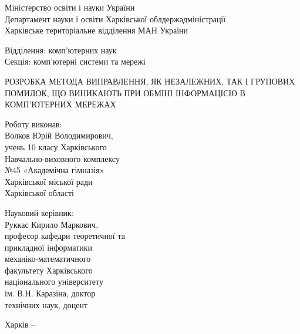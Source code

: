 \documentclass[a4paper, 14pt]{article}
\begin{document}
\thispagestyle{empty}
\begin{spacing}{1}
\begin{center}
Міністерство освіти і науки України\\
Департамент науки і освіти Харківської облдержадміністрації\\
Харківське територіальне відділення МАН України\\
\end{center}\par\null\par
\begin{changemargin}{10cm}{0cm}
Відділення: комп'ютерних наук\\
Секція: комп'ютерні системи та мережі
\end{changemargin}\par\null\par
\begin{center}
РОЗРОБКА МЕТОДА ВИПРАВЛЕННЯ, ЯК НЕЗАЛЕЖНИХ, ТАК І ГРУПОВИХ
ПОМИЛОК, ЩО ВИНИКАЮТЬ ПРИ ОБМІНІ ІНФОРМАЦІЄЮ В
КОМП'ЮТЕРНИХ МЕРЕЖАХ
\end{center}\par\null\par\null\par\null
\begin{changemargin}{10cm}{0cm}
Роботу виконав:\\ 
Волков Юрій Володимирович,\\
учень 10 класу Харківського\\
Навчально-виховного комплексу\\
№45 «Академічна гімназія»\\
Харківської міської ради\\
Харківської області
\end{changemargin}\par
\begin{changemargin}{10cm}{0cm}
Науковий керівник:\\
Руккас Кирило Маркович,\\
професор кафедри теоретичної та\\
прикладної інформатики\\
механіко-математичного\\
факультету Харківського\\
національного університету\\
ім. В.Н. Каразіна, доктор\\
технічних наук, доцент\\
\vspace*{\fill}\end{changemargin}
\begin{center}
Харків -- \the\year{}
\end{center}\end{spacing}
\end{document}
